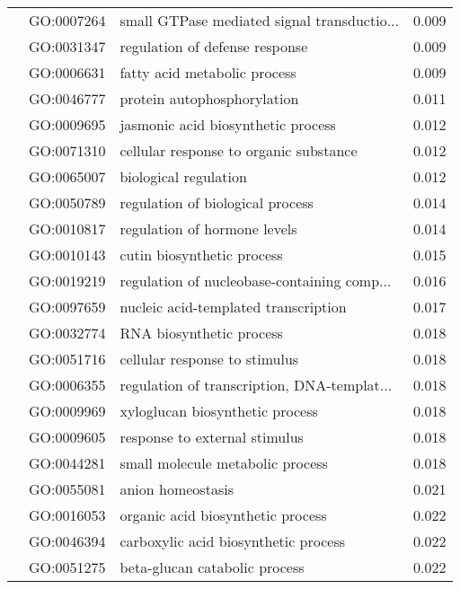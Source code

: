 \begin{longtable}{lllr}
   & GO:0007264 &  small GTPase mediated signal transductio... &         0.009 \\
   & GO:0031347 &               regulation of defense response &         0.009 \\
   & GO:0006631 &                 fatty acid metabolic process &         0.009 \\
   & GO:0046777 &                  protein autophosphorylation &         0.011 \\
   & GO:0009695 &           jasmonic acid biosynthetic process &         0.012 \\
   & GO:0071310 &       cellular response to organic substance &         0.012 \\
   & GO:0065007 &                        biological regulation &         0.012 \\
   & GO:0050789 &             regulation of biological process &         0.014 \\
   & GO:0010817 &                 regulation of hormone levels &         0.014 \\
   & GO:0010143 &                   cutin biosynthetic process &         0.015 \\
   & GO:0019219 &  regulation of nucleobase-containing comp... &         0.016 \\
   & GO:0097659 &         nucleic acid-templated transcription &         0.017 \\
   & GO:0032774 &                     RNA biosynthetic process &         0.018 \\
   & GO:0051716 &                cellular response to stimulus &         0.018 \\
   & GO:0006355 &  regulation of transcription, DNA-templat... &         0.018 \\
   & GO:0009969 &              xyloglucan biosynthetic process &         0.018 \\
   & GO:0009605 &                response to external stimulus &         0.018 \\
   & GO:0044281 &             small molecule metabolic process &         0.018 \\
   & GO:0055081 &                            anion homeostasis &         0.021 \\
   & GO:0016053 &            organic acid biosynthetic process &         0.022 \\
   & GO:0046394 &         carboxylic acid biosynthetic process &         0.022 \\
   & GO:0051275 &                beta-glucan catabolic process &         0.022 \\

\end{longtable}
